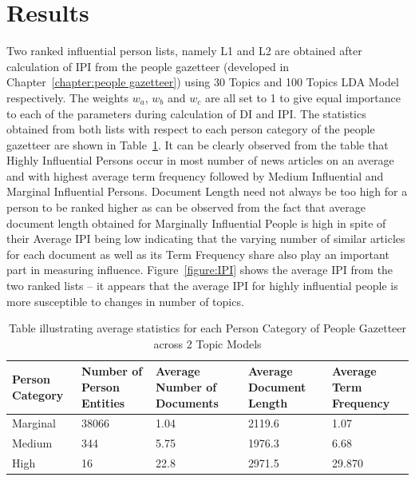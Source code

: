 \documentclass[10pt,journal,compsoc]{IEEEtran}
\begin{document}
\section{Results}
\label{influential:results}
Two ranked influential person lists, namely L1 and L2 are obtained after calculation of IPI from the people gazetteer (developed in Chapter~\ref{chapter:people gazetteer}) using 30 Topics and 100 Topics LDA Model respectively. The weights $w_a$, $w_b$ and $w_c$ are all set to 1 to give equal importance to each of the parameters during calculation of DI and IPI. The statistics obtained from both lists with respect to each person category of the people gazetteer are shown in Table~\ref{table:stats}. 
It can be clearly observed from the table that Highly Influential Persons occur in most number of news articles on an average and with highest average term frequency followed by Medium Influential and Marginal Influential Persons.
Document Length need not always be too high for a person to be ranked higher as can be observed from the fact that average document length obtained for Marginally Influential People is high in spite of their Average IPI being low indicating that the varying number of similar articles for each document as well as its Term Frequency share also play an important part in measuring influence. Figure~\ref{figure:IPI} shows the average IPI from the two ranked lists -- it appears that the average IPI for highly influential people is more susceptible to changes in number of topics.

\begin{table}
\begin{center}

    \begin{tabular}{|p{2cm}|p{2cm}|p{2cm}|p{2cm}|p{2cm}|}
    \hline
    \textbf{Person Category}  &  \textbf{Number of Person Entities}   & \textbf{Average Number of Documents}   &  \textbf{Average Document Length}	&  \textbf{Average Term Frequency}	\\  \hline
Marginal & 38066 & 1.04 & 2119.6 & 1.07 	\\ \hline
Medium & 344 & 5.75 & 1976.3 & 6.68  \\ \hline
High & 16 & 22.8 & 2971.5 & 29.870	 \\	\hline 
  \end{tabular}
  \end{center}
    \caption {Table illustrating average statistics for each Person Category of People Gazetteer across 2 Topic Models}
\label{table:stats}
\end{table}
\end{document}

